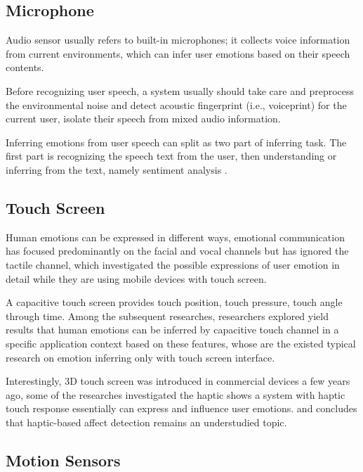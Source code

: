 \subsection{Microphone}\label{subsec:audio}
Audio sensor usually refers to built-in microphones; it collects voice information from current environments, which can infer user emotions based on their speech contents.

Before recognizing user speech, a system usually should take care and preprocess the environmental noise and detect acoustic fingerprint (i.e., voiceprint) \cite{boles2017voice} for the current user, isolate their speech from mixed audio information.

Inferring emotions from user speech can split as two part of inferring task. The first part is recognizing the speech text from the user\cite{mikolov2010recurrent, google2017}, then understanding or inferring from the text, namely sentiment analysis \cite{Rajalakshmi2017ACS}.

\subsection{Touch Screen}\label{subsec:touch}

Human emotions can be expressed in different ways, emotional communication has focused predominantly on the facial and vocal channels but has ignored the tactile channel\cite{hertenstein2009communication}, which investigated the possible expressions of user emotion in detail while they are using mobile devices with touch screen.

A capacitive touch screen provides touch position, touch pressure, touch angle through time. Among the subsequent researches\cite{Gao2012, Shah2015, Mottelson2016, bhattacharya2017predictive}, researchers explored yield results that human emotions can be inferred by capacitive touch channel in a specific application context based on these features, whose are the existed typical research on emotion inferring only with touch screen interface.

Interestingly, 3D touch screen was introduced in commercial devices a few years ago, some of the researches investigated the haptic  \cite{Eid2016} 
\cite{Mazzoni2016, Lentini2017} shows a system with haptic touch response essentially can express and influence user emotions. and \cite{Bhattacharya2017} concludes that haptic-based affect detection remains an understudied topic.

\subsection{Motion Sensors}\label{subsec:motion}

